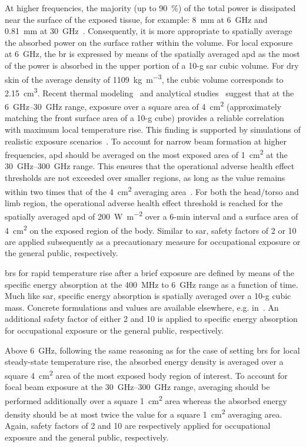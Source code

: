 At higher frequencies, the majority (up to \SI{90}{\percent}) of the total power is dissipated near the surface of the exposed tissue, for example: \SI{8}{\mm} at \SI{6}{\GHz} and \SI{0.81}{\mm} at \SI{30}{\GHz}~\cite{Sasaki2017Monte}.
Consequently, it is more appropriate to spatially average the absorbed power on the surface rather within the volume.
For local exposure at \SI{6}{\GHz}, the \gls{br} is expressed by means of the spatially averaged \gls{apd} as the most of the power is absorbed in the upper portion of a 10-g \gls{sar} cubic volume.
For dry skin of the average density of \SI{1109}{\kg\per\m\cubed}, the cubic volume corresponds to \SI{2.15}{\cm\cubed}.
Recent thermal modeling~\cite{Hashimoto2017averaging} and analytical studies~\cite{Foster2017Thermal} suggest that at the \SIrange{6}{30}{\GHz} range, exposure over a square area of \SI{4}{\cm\squared} (approximately matching the front surface area of a 10-g cube) provides a reliable correlation with maximum local temperature rise.
This finding is supported by simulations of realistic exposure scenarios~\cite{He2018RF}.
To account for narrow beam formation at higher frequencies, \gls{apd} should be averaged on the most exposed area of \SI{1}{\cm\squared} at the \SIrange{30}{300}{\GHz} range.
This ensures that the operational adverse health effect thresholds are not exceeded over smaller regions, as long as the value remains within two times that of the \SI{4}{\cm\squared} averaging area~\cite{Foster2016Thermal}.
For both the head/torso and limb region, the operational adverse health effect threshold is reached for the spatially averaged \gls{apd} of \SI{200}{\W\per\m\squared} over a 6-min interval and a surface area of \SI{4}{\cm\squared} on the exposed region of the body.
Similar to \gls{sar}, safety factors of \num{2} or \num{10} are applied subsequently as a precautionary measure for occupational exposure or the general public, respectively.

\Gls{br}s for rapid temperature rise after a brief exposure are defined by means of the specific energy absorption at the \SI{400}{\MHz} to \SI{6}{\GHz} range as a function of time.
Much like \gls{sar}, specific energy absorption is spatially averaged over a 10-g cubic mass.
Concrete formulations and values are available elsewhere, e.g. in~\cite{ICNIRP2020Guidelines,IEEE2019Standard}.
An additional safety factor of either \num{2} and \num{10} is applied to specific energy absorption for occupational exposure or the general public, respectively.

Above \SI{6}{\GHz}, following the same reasoning as for the case of setting \gls{br}s for local steady-state temperature rise, the absorbed energy density is averaged over a square \SI{4}{\cm\squared} area of the most exposed body region of interest.
To account for focal beam exposure at the \SIrange{30}{300}{\GHz} range, averaging should be performed additionally over a square \SI{1}{\cm\squared} area whereas the absorbed energy density should be at most twice the value for a square \SI{1}{\cm\squared} averaging area.
Again, safety factors of \num{2} and \num{10} are respectively applied for occupational exposure and the general public, respectively.


